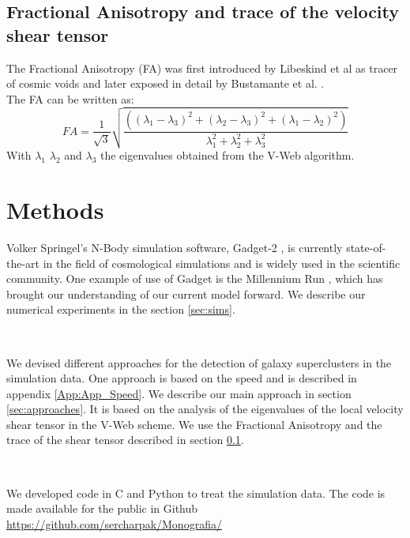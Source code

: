 \documentclass[12pt]{article}
\begin{document}
\subsection{Fractional Anisotropy and trace of the velocity shear tensor}
\label{sec:FA_trace}
The Fractional Anisotropy (FA) was first introduced by Libeskind et al \cite{libeskind_velocity_2013} as tracer of cosmic voids and later exposed in detail by Bustamante et al. \cite{bustamante_tensor_2015}.\\
The FA can be written as:
\[
FA = \frac{1}{\sqrt{3}} \sqrt{\frac{( \left( \lambda_1 - \lambda_3 \right)^2 + \left( \lambda_2 - \lambda_3 \right)^2 + \left( \lambda_1 - \lambda_2 \right)^2  )}{\lambda^{2}_1 + \lambda^{2}_2 + \lambda^{2}_3}} 
\]
With $\lambda_1$ $\lambda_2$ and $\lambda_3$ the eigenvalues obtained from the V-Web algorithm.


\section{Methods}
\begin{par}
Volker Springel's N-Body simulation software,
 Gadget-2 \cite{springel_gadget_2_2005}, is
  currently state-of-the-art in the field of
   cosmological simulations and is widely used in
    the scientific community. One example of use of
     Gadget is the Millennium Run
      \cite{springel_simulations_2005}, which has
       brought our understanding of our current
        model forward. We describe our numerical
         experiments in the section \ref{sec:sims}.
\end{par}
\\
\begin{par}
We devised different approaches for the detection of
 galaxy superclusters in the simulation data. One
  approach is based on the speed and is described in
   appendix \ref{App:App_Speed}. We describe our
    main approach in section \ref{sec:approaches}.
     It is based on the analysis of the 
    eigenvalues of the local velocity shear tensor
     in the V-Web scheme. We use the Fractional
      Anisotropy and the trace of the shear tensor
       described in section \ref{sec:FA_trace}. 
\end{par}
\\
\begin{par}
We developed code in C and Python to treat the
 simulation data. The code is made available for the
  public in Github
   \url{https://github.com/sercharpak/Monografia/}
\end{par}
\end{document}
